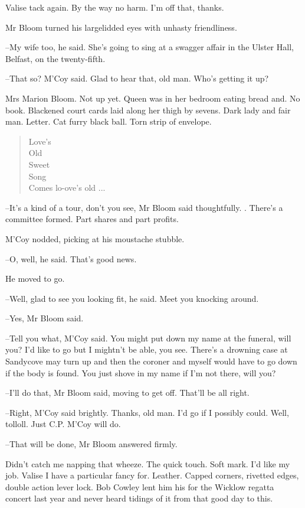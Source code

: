 Valise tack again.
By the way no harm.
I'm off that, thanks.

Mr Bloom turned his largelidded eyes
with unhasty friendliness.

--My wife too,
he said.
She's going to sing at a swagger affair in the Ulster Hall, Belfast,
on the twenty-fifth.

--That so?
M'Coy said.
Glad to hear that,
old man.
Who's getting it up?

Mrs Marion Bloom.
Not up yet.
Queen was in her bedroom eating bread and.
No book.
Blackened court cards laid along her thigh by sevens.
Dark lady and fair man.
Letter.
Cat furry black ball.
Torn strip of envelope.


\begin{verse}
    Love's \\
    Old \\
    Sweet \\
    Song \\
    Comes lo-ove's old ...
\end{verse}


--It's a kind of a tour,
don't you see,
Mr Bloom said thoughtfully.
.
There's a committee formed.
Part shares and part profits.

M'Coy nodded,
picking at his moustache stubble.

--O, well,
he said.
That's good news.

He moved to go.

--Well, glad to see you looking fit,
he said.
Meet you knocking around.

--Yes,
Mr Bloom said.

--Tell you what,
M'Coy said.
You might put down my name at the funeral,
will you?
I'd like to go but I mightn't be able, you see.
There's a drowning case at Sandycove may turn up
and then the coroner and myself would have to go down
if the body is found.
You just shove in my name if I'm not there,
will you?

--I'll do that,
Mr Bloom said,
moving to get off.
That'll be all right.

--Right, M'Coy said brightly.
Thanks, old man.
I'd go if I possibly could.
Well, tolloll.
Just C.P. M'Coy will do.

--That will be done,
Mr Bloom answered firmly.

Didn't catch me napping that wheeze.
The quick touch.
Soft mark.
I'd like my job.
Valise I have a particular fancy for.
Leather.
Capped corners,
rivetted edges,
double action lever lock.
Bob Cowley lent him his for the Wicklow regatta concert last year
and never heard tidings of it from that good day to this.

